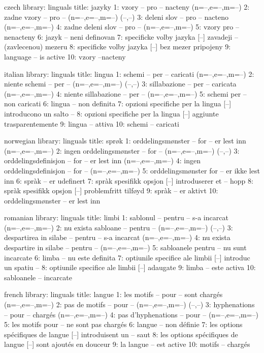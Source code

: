 
\startmessages  czech  library: linguals
  title: jazyky
      1: vzory -- pro -- nacteny (n=--,e=--,m=--)
      2: zadne vzory -- pro -- (n=--,e=--,m=--) (--,--)
      3: deleni slov -- pro -- nacteno (n=--,e=--,m=--)
      4: zadne deleni slov -- pro -- (n=--,e=--,m=--)
      5: vzory pro -- nenacteny
      6: jazyk -- neni definovan
      7: specificke volby jazyka [--] zavadeji -- (zavlecenou) mezeru
      8: specificke volby jazyka [--] bez mezer pripojeny
      9: language -- is active
     10: vzory --nacteny
\stopmessages

\startmessages  italian  library: linguals
  title: lingua
      1: schemi -- per -- caricati (n=--,e=--,m=--)
      2: niente schemi -- per -- (n=--,e=--,m=--) (--,--)
      3: sillabazione -- per -- caricata (n=--,e=--,m=--)
      4: niente sillabazione -- per -- (n=--,e=--,m=--)
      5: schemi per -- non caricati
      6: lingua -- non definita
      7: opzioni specifiche per la lingua [--] introducono un salto --
      8: opzioni specifiche per la lingua [--] aggiunte trasparentemente
      9: lingua -- attiva
     10: schemi -- caricati
\stopmessages

\startmessages  norwegian  library: linguals
  title: sprøk
      1: orddelingsmønster -- for -- er lest inn (n=--,e=--,m=--)
      2: ingen orddelingsmønster -- for -- (n=--,e=--,m=--) (--,--)
      3: orddelingsdefinisjon -- for -- er lest inn (n=--,e=--,m=--)
      4: ingen orddelingsdefinisjon -- for -- (n=--,e=--,m=--)
      5: orddelingsmønster for -- er ikke lest inn
      6: spràk -- er udefinert
      7: spràk spesifikk opsjon [--] introduserer et -- hopp
      8: spràk spesifikk opsjon [--] problemfritt tilføyd
      9: spràk -- er aktivt
     10: orddelingsmønster -- er lest inn
\stopmessages

\startmessages  romanian  library: linguals
  title: limbi
      1: sablonul -- pentru -- s-a incarcat (n=--,e=--,m=--)
      2: nu exista sabloane -- pentru -- (n=--,e=--,m=--) (--,--)
      3: despartirea in silabe -- pentru -- s-a incarcat (n=--,e=--,m=--)
      4: nu exista despartire in silabe -- pentru -- (n=--,e=--,m=--)
      5: sabloanele pentru -- nu sunt incarcate
      6: limba -- nu este definita
      7: optiunile specifice ale limbii [--] introduc un spatiu --
      8: optiunile specifice ale limbii [--] adaugate
      9: limba -- este activa
     10: sabloanele -- incarcate
\stopmessages

\startmessages  french  library: linguals
  title: langue
      1: les motifs -- pour -- sont chargés (n=--,e=--,m=--)
      2: pas de motifs -- pour -- (n=--,e=--,m=--) (--,--)
      3: hyphenations -- pour -- chargés (n=--,e=--,m=--)
      4: pas d'hyphenations -- pour -- (n=--,e=--,m=--)
      5: les motifs pour -- ne sont pas chargés
      6: langue -- non définie
      7: les options spécifiques de langue [--] introduisent un -- saut
      8: les options spécifiques de langue [--] sont ajoutés en douceur
      9: la langue -- est active
     10: motifs -- chargés
\stopmessages

